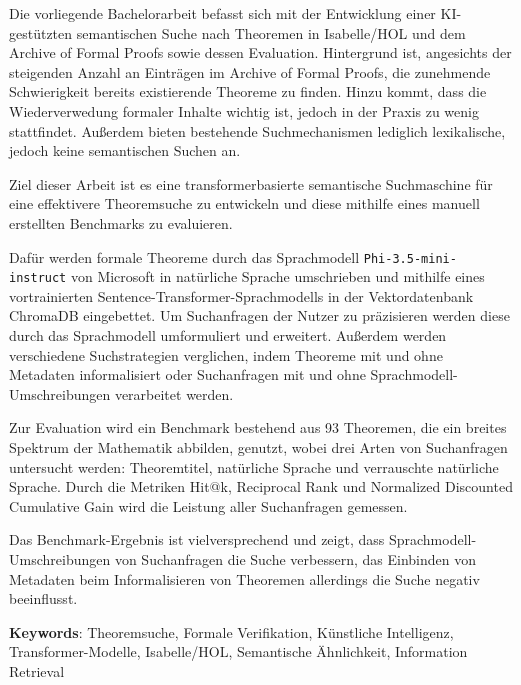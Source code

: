 {}
{}
Die vorliegende Bachelorarbeit befasst sich mit der Entwicklung einer KI-gestützten semantischen Suche nach Theoremen in Isabelle/HOL und dem Archive of Formal Proofs sowie dessen Evaluation.
Hintergrund ist, angesichts der steigenden Anzahl an Einträgen im Archive of Formal Proofs, die zunehmende Schwierigkeit bereits existierende Theoreme zu finden.
Hinzu kommt, dass die Wiederverwedung formaler Inhalte wichtig ist, jedoch in der Praxis zu wenig stattfindet.
Außerdem bieten bestehende Suchmechanismen lediglich lexikalische, jedoch keine semantischen Suchen an.

Ziel dieser Arbeit ist es eine transformerbasierte semantische Suchmaschine für eine effektivere Theoremsuche zu entwickeln und diese mithilfe eines manuell erstellten Benchmarks zu evaluieren.

Dafür werden formale Theoreme durch das Sprachmodell \texttt{Phi-3.5-mini-instruct} von Microsoft in natürliche Sprache umschrieben und mithilfe eines vortrainierten Sentence-Transformer-Sprachmodells in der Vektordatenbank ChromaDB eingebettet.
Um Suchanfragen der Nutzer zu präzisieren werden diese durch das Sprachmodell umformuliert und erweitert.
Außerdem werden verschiedene Suchstrategien verglichen, indem Theoreme mit und ohne Metadaten informalisiert oder Suchanfragen mit und ohne Sprachmodell-Umschreibungen verarbeitet werden.

Zur Evaluation wird ein Benchmark bestehend aus 93 Theoremen, die ein breites Spektrum der Mathematik abbilden, genutzt, wobei drei Arten von Suchanfragen untersucht werden: Theoremtitel, natürliche Sprache und verrauschte natürliche Sprache.
Durch die Metriken Hit@k, Reciprocal Rank und Normalized Discounted Cumulative Gain wird die Leistung aller Suchanfragen gemessen.

Das Benchmark-Ergebnis ist vielversprechend und zeigt, dass Sprachmodell-Umschreibungen von Suchanfragen die Suche verbessern, das Einbinden von Metadaten beim Informalisieren von Theoremen allerdings die Suche negativ beeinflusst.

\textbf{Keywords}: Theoremsuche, Formale Verifikation, Künstliche Intelligenz, Transformer-Modelle, Isabelle/HOL, Semantische Ähnlichkeit, Information Retrieval
